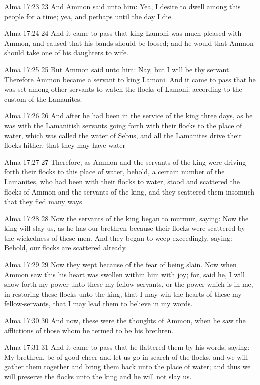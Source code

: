Alma 17:23
 23 And Ammon said unto him: Yea, I desire to dwell among this
people for a time; yea, and perhaps until the day I die.

Alma 17:24
 24 And it came to pass that king Lamoni was much pleased with
Ammon, and caused that his bands should be loosed; and he would
that Ammon should take one of his daughters to wife.

Alma 17:25
 25 But Ammon said unto him: Nay, but I will be thy servant.
Therefore Ammon became a servant to king Lamoni. And it came to
pass that he was set among other servants to watch the flocks of
Lamoni, according to the custom of the Lamanites.

Alma 17:26
 26 And after he had been in the service of the king three days,
as he was with the Lamanitish servants going forth with their
flocks to the place of water, which was called the water of
Sebus, and all the Lamanites drive their flocks hither, that they
may have water--

Alma 17:27
 27 Therefore, as Ammon and the servants of the king were driving
forth their flocks to this place of water, behold, a certain
number of the Lamanites, who had been with their flocks to water,
stood and scattered the flocks of Ammon and the servants of the
king, and they scattered them insomuch that they fled many ways.

Alma 17:28
 28 Now the servants of the king began to murmur, saying: Now the
king will slay us, as he has our brethren because their flocks
were scattered by the wickedness of these men. And they began to
weep exceedingly, saying: Behold, our flocks are scattered
already.

Alma 17:29
 29 Now they wept because of the fear of being slain. Now when
Ammon saw this his heart was swollen within him with joy; for,
said he, I will show forth my power unto these my
fellow-servants, or the power which is in me, in restoring these
flocks unto the king, that I may win the hearts of these my
fellow-servants, that I may lead them to believe in my words.

Alma 17:30
 30 And now, these were the thoughts of Ammon, when he saw the
afflictions of those whom he termed to be his brethren.

Alma 17:31
 31 And it came to pass that he flattered them by his words,
saying: My brethren, be of good cheer and let us go in search of
the flocks, and we will gather them together and bring them back
unto the place of water; and thus we will preserve the flocks
unto the king and he will not slay us.


